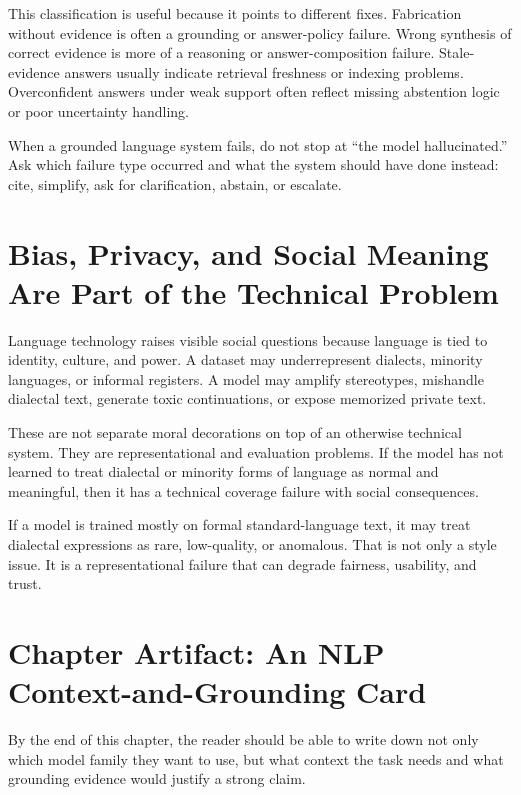 This classification is useful because it points to different fixes. Fabrication without evidence is often a grounding or answer-policy failure. Wrong synthesis of correct evidence is more of a reasoning or answer-composition failure. Stale-evidence answers usually indicate retrieval freshness or indexing problems. Overconfident answers under weak support often reflect missing abstention logic or poor uncertainty handling.

\begin{decisionbox}
When a grounded language system fails, do not stop at ``the model hallucinated.'' Ask which failure type occurred and what the system should have done instead: cite, simplify, ask for clarification, abstain, or escalate.
\end{decisionbox}

\section{Bias, Privacy, and Social Meaning Are Part of the Technical Problem}

Language technology raises visible social questions because language is tied to identity, culture, and power. A dataset may underrepresent dialects, minority languages, or informal registers. A model may amplify stereotypes, mishandle dialectal text, generate toxic continuations, or expose memorized private text.

These are not separate moral decorations on top of an otherwise technical system. They are representational and evaluation problems. If the model has not learned to treat dialectal or minority forms of language as normal and meaningful, then it has a technical coverage failure with social consequences.

\begin{example}
If a model is trained mostly on formal standard-language text, it may treat dialectal expressions as rare, low-quality, or anomalous. That is not only a style issue. It is a representational failure that can degrade fairness, usability, and trust.
\end{example}

\section{Chapter Artifact: An NLP Context-and-Grounding Card}

By the end of this chapter, the reader should be able to write down not only which model family they want to use, but what context the task needs and what grounding evidence would justify a strong claim.


